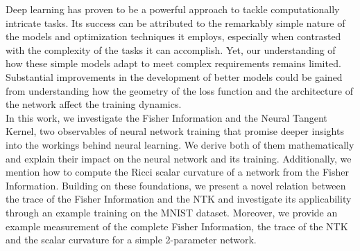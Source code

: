 Deep learning has proven to be a powerful approach to tackle computationally intricate tasks. Its success can be attributed to the remarkably simple nature of the models and optimization techniques it employs, especially when contrasted with the complexity of the tasks it can accomplish. Yet, our understanding of how these simple models adapt to meet complex requirements remains limited. Substantial improvements in the development of better models could be gained from understanding how the geometry of the loss function and the architecture of the network affect the training dynamics.\\
In this work, we investigate the Fisher Information and the Neural Tangent Kernel, two observables of neural network training that promise deeper insights into the workings behind neural learning. We derive both of them mathematically and explain their impact on the neural network and its training. Additionally, we mention how to compute the Ricci scalar curvature of a network from the Fisher Information. Building on these foundations, we present a novel relation between the trace of the Fisher Information and the NTK and investigate its applicability through an example training on the MNIST dataset. Moreover, we provide an example measurement of the complete Fisher Information, the trace of the NTK and the scalar curvature for a simple 2-parameter network.